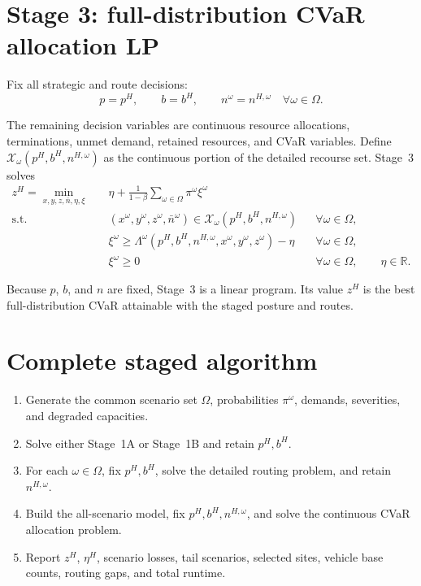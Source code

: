 \documentclass[11pt]{article}
\newcommand{\R}{\mathbb{R}}
\begin{document}
\section{Stage 3: full-distribution CVaR allocation LP}

Fix all strategic and route decisions:
\begin{equation}
p=p^H,
\qquad
b=b^H,
\qquad
n^\omega=n^{H,\omega}
\quad\forall\omega\in\Omega.
\label{eq:stage3-fixing}
\end{equation}

The remaining decision variables are continuous resource allocations,
terminations, unmet demand, retained resources, and CVaR variables.  Define
$\mathcal X_\omega(p^H,b^H,n^{H,\omega})$ as the continuous portion of the
detailed recourse set.  Stage~3 solves
\begin{align}
z^H=\min_{x,y,z,\bar n,\eta,\xi}\quad
&\eta+
\frac{1}{1-\beta}
\sum_{\omega\in\Omega}\pi^\omega\xi^\omega
\label{eq:stage3-objective}\\
\text{s.t.}\quad
&(x^\omega,y^\omega,z^\omega,\bar n^\omega)
\in
\mathcal X_\omega(p^H,b^H,n^{H,\omega})
&&\forall\omega\in\Omega,
\label{eq:stage3-allocation}\\
&\xi^\omega\geq
\Lambda^\omega(p^H,b^H,n^{H,\omega},x^\omega,y^\omega,z^\omega)-\eta
&&\forall\omega\in\Omega,
\label{eq:stage3-cvar}\\
&\xi^\omega\geq0
&&\forall\omega\in\Omega,
\qquad\eta\in\R.
\end{align}

Because $p$, $b$, and $n$ are fixed, Stage~3 is a linear program.  Its value
$z^H$ is the best full-distribution CVaR attainable with the staged posture and
routes.

\section{Complete staged algorithm}

\begin{enumerate}[label=\textbf{Step \arabic*:},leftmargin=18mm]
\item Generate the common scenario set $\Omega$, probabilities $\pi^\omega$,
      demands, severities, and degraded capacities.
\item Solve either Stage~1A or Stage~1B and retain $p^H,b^H$.
\item For each $\omega\in\Omega$, fix $p^H,b^H$, solve the detailed routing
      problem, and retain $n^{H,\omega}$.
\item Build the all-scenario model, fix $p^H,b^H,n^{H,\omega}$, and solve the
      continuous CVaR allocation problem.
\item Report $z^H$, $\eta^H$, scenario losses, tail scenarios, selected sites,
      vehicle base counts, routing gaps, and total runtime.
\end{enumerate}
\end{document}
